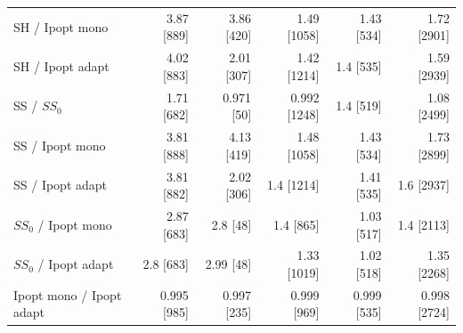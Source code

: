 \begin{tabular}{@{}lrrrrr@{}}
SH / Ipopt mono & 3.87 [889] & 3.86 [420] & 1.49 [1058] & 1.43 [534] & 1.72 [2901] \\
SH / Ipopt adapt & 4.02 [883] & 2.01 [307] & 1.42 [1214] & 1.4 [535] & 1.59 [2939] \\
SS / $SS_0$ & 1.71 [682] & 0.971 [50] & 0.992 [1248] & 1.4 [519] & 1.08 [2499] \\
SS / Ipopt mono & 3.81 [888] & 4.13 [419] & 1.48 [1058] & 1.43 [534] & 1.73 [2899] \\
SS / Ipopt adapt & 3.81 [882] & 2.02 [306] & 1.4 [1214] & 1.41 [535] & 1.6 [2937] \\
$SS_0$ / Ipopt mono & 2.87 [683] & 2.8 [48] & 1.4 [865] & 1.03 [517] & 1.4 [2113] \\
$SS_0$ / Ipopt adapt & 2.8 [683] & 2.99 [48] & 1.33 [1019] & 1.02 [518] & 1.35 [2268] \\
Ipopt mono / Ipopt adapt & 0.995 [985] & 0.997 [235] & 0.999 [969] & 0.999 [535] & 0.998 [2724] \\
\bottomrule
\end{tabular}
